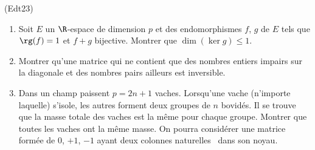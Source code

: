 \begin{tiny}(Edt23)\end{tiny}
\begin{enumerate}
 \item Soit $E$ un $\R$-espace de dimension $p$ et des endomorphismes $f$, $g$ de $E$ tels que $\rg(f) = 1$ et 
 $f + g$ bijective. Montrer que $\dim (\ker g) \leq 1$.
 \item Montrer qu'une matrice qui ne contient que des nombres entiers impairs sur la diagonale et des nombres pairs ailleurs est inversible.
 \item Dans un champ paissent $p=2n+1$ vaches. Lorsqu'une vache (n'importe laquelle) s'isole, les autres forment deux groupes de $n$ bovidés. Il se trouve que la masse totale des vaches est la même pour chaque groupe. Montrer que toutes les vaches ont la même masse.\newline
 On pourra considérer une matrice formée de $0$, $+1$, $-1$ ayant deux colonnes \og naturelles\fg~ dans son noyau.
\end{enumerate}

